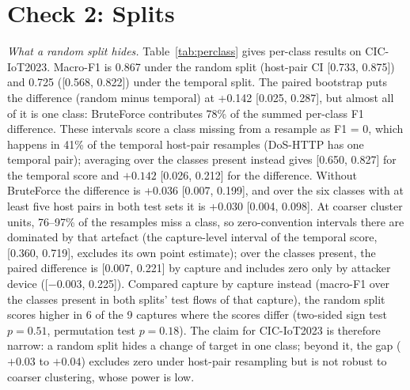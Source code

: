 \section{Check 2: Splits}\label{sec:splits}

\emph{What a random split hides.} Table~\ref{tab:perclass} gives per-class results on CIC-IoT2023. Macro-F1 is 0.867 under the random split (host-pair CI [0.733, 0.875]) and 0.725 ([0.568, 0.822]) under the temporal split. The paired bootstrap puts the difference (random minus temporal) at +0.142 [0.025, 0.287], but almost all of it is one class: BruteForce contributes 78\% of the summed per-class F1 difference. These intervals score a class missing from a resample as F1 = 0, which happens in 41\% of the temporal host-pair resamples (DoS-HTTP has one temporal pair); averaging over the classes present instead gives [0.650, 0.827] for the temporal score and $+0.142$ [0.026, 0.212] for the difference. Without BruteForce the difference is +0.036 [0.007, 0.199], and over the six classes with at least five host pairs in both test sets it is +0.030 [0.004, 0.098]. At coarser cluster units, 76--97\% of the resamples miss a class, so zero-convention intervals there are dominated by that artefact (the capture-level interval of the temporal score, [0.360, 0.719], excludes its own point estimate); over the classes present, the paired difference is [0.007, 0.221] by capture and includes zero only by attacker device ([$-0.003$, 0.225]). Compared capture by capture instead (macro-F1 over the classes present in both splits' test flows of that capture), the random split scores higher in 6 of the 9 captures where the scores differ (two-sided sign test $p=0.51$, permutation test $p=0.18$). The claim for CIC-IoT2023 is therefore narrow: a random split hides a change of target in one class; beyond it, the gap ($+0.03$ to $+0.04$) excludes zero under host-pair resampling but is not robust to coarser clustering, whose power is low.


